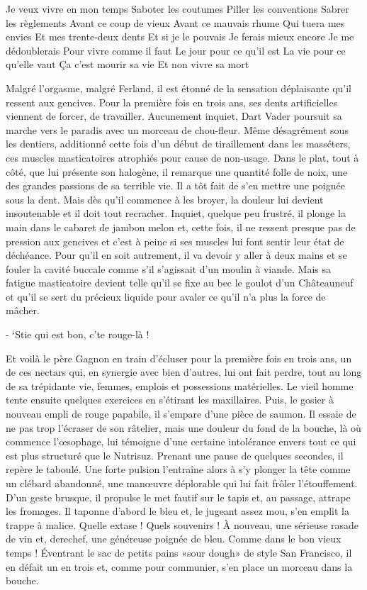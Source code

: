     Je veux vivre en mon temps
    Saboter les coutumes
    Piller les conventions
    Sabrer les règlements
    Avant ce coup de vieux
    Avant ce mauvais rhume
    Qui tuera mes envies
    Et mes trente-deux dents
    Et si je le pouvais
    Je ferais mieux encore
    Je me dédoublerais
    Pour vivre comme il faut
    Le jour pour ce qu’il est
    La vie pour ce qu’elle vaut
    Ça c’est mourir sa vie
    Et non vivre sa mort

Malgré l’orgasme, malgré Ferland, il est étonné de la sensation déplaisante qu’il ressent aux gencives. Pour la première fois en trois ans, ses dents artificielles viennent de forcer, de travailler. Aucunement inquiet, Dart Vader poursuit sa marche vers le paradis avec un morceau de chou-fleur. Même désagrément sous les dentiers, additionné cette fois d’un début de tiraillement dans les masséters, ces muscles masticatoires atrophiés pour cause de non-usage. Dans le plat, tout à côté, que lui présente son halogène, il remarque une quantité folle de noix, une des grandes passions de sa terrible vie. Il a tôt fait de s’en mettre une poignée sous la dent. Mais dès qu’il commence à les broyer, la douleur lui devient insoutenable et il doit tout recracher. Inquiet, quelque peu frustré, il plonge la main dans le cabaret de jambon melon et, cette fois, il ne ressent presque pas de pression aux gencives et c’est à peine si ses muscles lui font sentir leur état de déchéance. Pour qu’il en soit autrement, il va devoir y aller à deux mains et se fouler la cavité buccale comme s’il s’agissait d’un moulin à viande. Mais sa fatigue masticatoire devient telle qu’il se fixe au bec le goulot d’un Châteauneuf et qu’il se sert du précieux liquide pour avaler ce qu’il n’a plus la force de mâcher.

- ‘Stie qui est bon, c’te rouge-là !

Et voilà le père Gagnon en train d’écluser pour la première fois en trois ans, un de ces nectars qui, en synergie avec bien d’autres, lui ont fait perdre, tout au long de sa trépidante vie, femmes, emplois et possessions matérielles. Le vieil homme tente ensuite quelques exercices en s’étirant les maxillaires. Puis, le gosier à nouveau empli de rouge papabile, il s’empare d’une pièce de saumon. Il essaie de ne pas trop l’écraser de son râtelier, mais une douleur du fond de la bouche, là où commence l’œsophage, lui témoigne d’une certaine intolérance envers tout ce qui est plus structuré que le Nutrisuz. Prenant une pause de quelques secondes, il repère le taboulé. Une forte pulsion l’entraîne alors à s’y plonger la tête comme un clébard abandonné, une manœuvre déplorable qui lui fait frôler l’étouffement. D’un geste brusque, il propulse le met fautif sur le tapis et, au passage, attrape les fromages. Il taponne d’abord le bleu et, le jugeant assez mou, s’en emplit la trappe à malice. Quelle extase ! Quels souvenirs ! À nouveau, une sérieuse rasade de vin et, derechef, une généreuse poignée de bleu. Comme dans le bon vieux temps ! Éventrant le sac de petits pains «sour dough» de style San Francisco, il en défait un en trois et, comme pour communier, s’en place un morceau dans la bouche.

